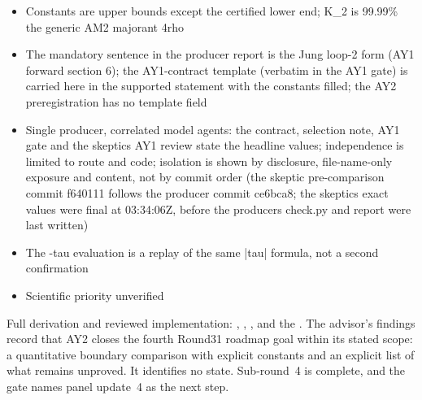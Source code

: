 \begin{gatequote}
\begin{itemize}
cutoff passage; AV1 split and cutoff-vector removal (F22); AY1 F13/F14 and the
passage to every limit through closed trace-norm balls; AQ1 compactness and
extraction; the I1 dictionary; SU(2) Haar orthogonality and the spectral
theorem are standard
\item Constants are upper bounds except the certified lower end;
K\_2\textquotesingle{} is 99.99\% the generic AM2 majorant 4rho
\item The mandatory sentence in the producer report is the Jung loop-2 form
(AY1 forward section 6); the AY1-contract template (verbatim in the AY1 gate)
is carried here in the supported statement with the constants filled; the AY2
preregistration has no template field
\item Single producer, correlated model agents: the contract, selection note,
AY1 gate and the skeptic\textquotesingle{}s AY1 review state the headline
values; independence is limited to route and code; isolation is shown by
disclosure, file-name-only exposure and content, not by commit order (the
skeptic pre-comparison commit f640111 follows the producer commit ce6bca8; the
skeptic\textquotesingle{}s exact values were final at 03:34:06Z, before the
producer\textquotesingle{}s check.py and report were last written)
\item The -tau evaluation is a replay of the same |tau| formula, not a second
confirmation
\item Scientific priority unverified
\end{itemize}
\end{gatequote}
Full derivation and reviewed implementation:
,
,
,
 and the
. The advisor's
findings record that AY2 closes the fourth Round31 roadmap goal within its
stated scope: a quantitative boundary comparison with explicit constants and
an explicit list of what remains unproved. It identifies no state.
Sub-round~4 is complete, and the gate names panel update~4 as the next step.
